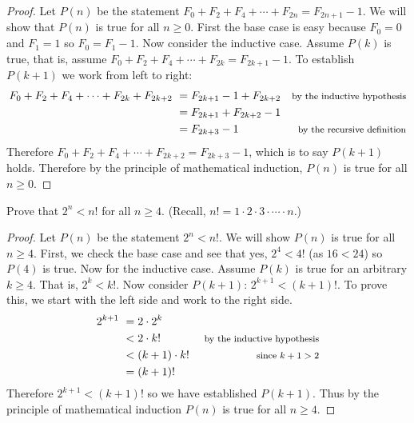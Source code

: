\begin{questions}
	\begin{answer}
		\begin{proof}
		 Let $P(n)$ be the statement $F_0 + F_2 + F_4 + \cdots + F_{2n} = F_{2n+1} - 1$.  We will show that $P(n)$ is true for all $n \ge 0$.  First the base case is easy because $F_0 = 0$ and $F_1 = 1$ so $F_0 = F_1 - 1$.  Now consider the inductive case.  Assume $P(k)$ is true, that is, assume $F_0 + F_2 + F_4 + \cdots + F_{2k} = F_{2k+1} - 1$.  To establish $P(k+1)$ we work from left to right:
		 \begin{align*}
		  F_0 + F_2 + F_4 + \cdots + F_{2k} + F_{2k+2} ~ & = F_{2k+1} - 1 + F_{2k+2} & \mbox{\footnotesize by the inductive hypothesis}\\
		  & = F_{2k+1} + F_{2k+2} - 1 & \\
		  & = F_{2k+3} - 1 & \mbox{\footnotesize by the recursive definition}
		 \end{align*}
		Therefore $F_0 + F_2 + F_4 + \cdots + F_{2k+2} = F_{2k+3} - 1$, which is to say $P(k+1)$ holds.  Therefore by the principle of mathematical induction, $P(n)$ is true for all $n \ge 0$.
		\end{proof}
	\end{answer}
	
	
	

\question Prove that $2^n < n!$ for all $n \ge 4$.  (Recall, $n! = 1\cdot 2 \cdot 3 \cdot \cdots\cdot n$.)

	\begin{answer}
		\begin{proof}
		 Let $P(n)$ be the statement $2^n < n!$.  We will show $P(n)$ is true for all $n \ge 4$.  First, we check the base case and see that yes, $2^4 < 4!$ (as $16 < 24$) so $P(4)$ is true.  Now for the inductive case.  Assume $P(k)$ is true for an arbitrary $k \ge 4$.  That is, $2^k < k!$.  Now consider $P(k+1)$: $2^{k+1} < (k+1)!$.  To prove this, we start with the left side and work to the right side.
		 \begin{align*}
		  2^{k+1}~ & = 2\cdot 2^k & \\
		  & < 2\cdot k! & \mbox{ \footnotesize by the inductive hypothesis}\\
		  & < (k+1) \cdot k! & \mbox{ \footnotesize since $k+1 > 2$}\\
		  & = (k+1)! &
		 \end{align*}
		Therefore $2^{k+1} < (k+1)!$ so we have established $P(k+1)$.  Thus by the principle of mathematical induction $P(n)$ is true for all $n \ge 4$.
		\end{proof}
	\end{answer}
	

\end{questions}
